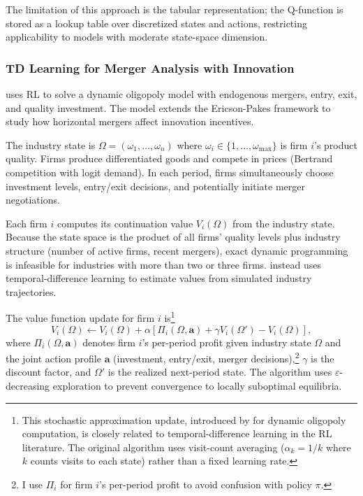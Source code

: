 The limitation of this approach is the tabular representation; the Q-function is stored as a lookup table over discretized states and actions, restricting applicability to models with moderate state-space dimension.


\subsubsection{TD Learning for Merger Analysis with Innovation}

\citet{Hollenbeck2019} uses RL to solve a dynamic oligopoly model with endogenous mergers, entry, exit, and quality investment. The model extends the Ericson-Pakes framework to study how horizontal mergers affect innovation incentives.

The industry state is $\Omega = (\omega_1, \ldots, \omega_n)$ where $\omega_i \in \{1, \ldots, \omega_{\max}\}$ is firm $i$'s product quality. Firms produce differentiated goods and compete in prices (Bertrand competition with logit demand). In each period, firms simultaneously choose investment levels, entry/exit decisions, and potentially initiate merger negotiations.

Each firm $i$ computes its continuation value $V_i(\Omega)$ from the industry state. Because the state space is the product of all firms' quality levels plus industry structure (number of active firms, recent mergers), exact dynamic programming is infeasible for industries with more than two or three firms. \citet{Hollenbeck2019} instead uses temporal-difference learning to estimate values from simulated industry trajectories.

The value function update for firm $i$ is\footnote{This stochastic approximation update, introduced by \citet{PakesMcGuire1994} for dynamic oligopoly computation, is closely related to temporal-difference learning in the RL literature. The original algorithm uses visit-count averaging ($\alpha_k = 1/k$ where $k$ counts visits to each state) rather than a fixed learning rate.}
\begin{equation}
V_i(\Omega) \leftarrow V_i(\Omega) + \alpha\left[\Pi_i(\Omega, \mathbf{a}) + \gamma V_i(\Omega') - V_i(\Omega)\right], \label{eq:hollenbeck_td}
\end{equation}
where $\Pi_i(\Omega, \mathbf{a})$ denotes firm $i$'s per-period profit given industry state $\Omega$ and the joint action profile $\mathbf{a}$ (investment, entry/exit, merger decisions),\footnote{I use $\Pi_i$ for firm $i$'s per-period profit to avoid confusion with policy $\pi$.} $\gamma$ is the discount factor, and $\Omega'$ is the realized next-period state. The algorithm uses $\varepsilon$-decreasing exploration to prevent convergence to locally suboptimal equilibria.

